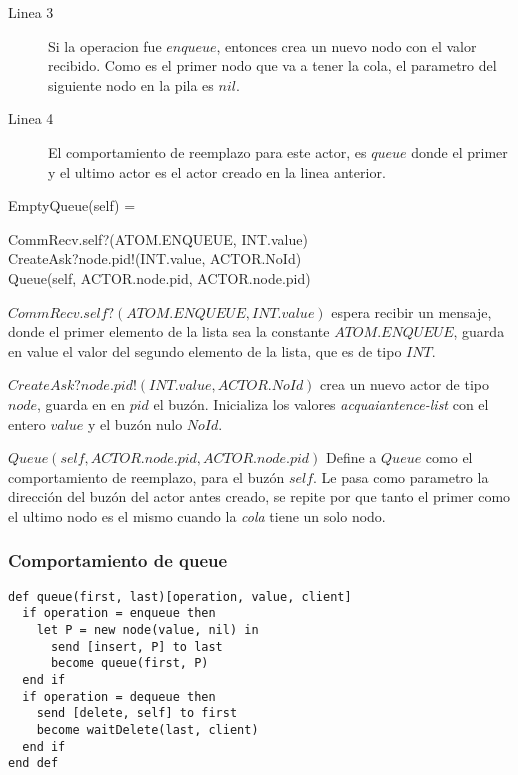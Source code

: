 \begin{description}
 \item [Linea 3] Si la operacion fue $enqueue$, entonces crea un nuevo nodo con el valor recibido. Como es el primer nodo que va a tener la cola, el parametro del siguiente nodo en la pila es $nil$. 
 \item [Linea 4] El comportamiento de reemplazo para este actor, es $queue$ donde el primer y el ultimo actor es el actor creado en la linea anterior.
\end{description}

\begin{process}
EmptyQueue(self) = \\ \quad
  \begin{block}
  CommRecv.self?(ATOM.ENQUEUE, INT.value) \then \\ 
  CreateAsk?node.pid!(INT.value, ACTOR.NoId) \then \\
  Queue(self, ACTOR.node.pid, ACTOR.node.pid)
  \end{block}
\end{process}

\begin{description}
 \item $CommRecv.self?(ATOM.ENQUEUE, INT.value)$ espera recibir un mensaje, donde el primer elemento de la lista sea la constante $ATOM.ENQUEUE$, guarda en value el valor del segundo elemento de la lista, que es de tipo $INT$.
 \item $CreateAsk?node.pid!(INT.value, ACTOR.NoId)$ crea un nuevo actor de tipo $node$, guarda en en $pid$ el buzón. Inicializa los valores \textit{acquaiantence-list} con el entero $value$ y el buzón nulo $NoId$.
 \item $Queue(self, ACTOR.node.pid, ACTOR.node.pid)$ Define a $Queue$ como el comportamiento de reemplazo, para el buzón $self$. Le pasa como parametro la dirección del buzón del actor antes creado, se repite por que tanto el primer como el ultimo nodo es el mismo cuando la \textit{cola} tiene un solo nodo.
\end{description}

\subsubsection*{Comportamiento de queue}

\begin{lstlisting}[language=sal, style=simple]
def queue(first, last)[operation, value, client]
  if operation = enqueue then
    let P = new node(value, nil) in
      send [insert, P] to last
      become queue(first, P)
  end if
  if operation = dequeue then
    send [delete, self] to first
    become waitDelete(last, client)
  end if
end def
\end{lstlisting}

